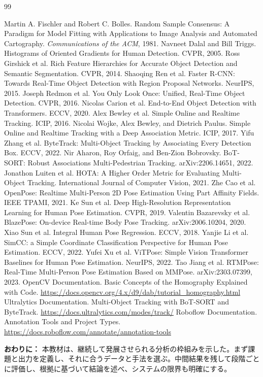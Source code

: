 \documentclass[11pt,a4paper,oneside]{report}
\renewcommand{\bibname}{参考文献}
\begin{document}
\renewcommand{\bibname}{参考文献・関連資料}
\small
\begin{thebibliography}{99}
 Martin A. Fischler and Robert C. Bolles. Random Sample Consensus: A Paradigm for Model Fitting with Applications to Image Analysis and Automated Cartography. \textit{Communications of the ACM}, 1981.
 Navneet Dalal and Bill Triggs. Histograms of Oriented Gradients for Human Detection. CVPR, 2005.
 Ross Girshick et al. Rich Feature Hierarchies for Accurate Object Detection and Semantic Segmentation. CVPR, 2014.
 Shaoqing Ren et al. Faster R-CNN: Towards Real-Time Object Detection with Region Proposal Networks. NeurIPS, 2015.
 Joseph Redmon et al. You Only Look Once: Unified, Real-Time Object Detection. CVPR, 2016.
 Nicolas Carion et al. End-to-End Object Detection with Transformers. ECCV, 2020.
 Alex Bewley et al. Simple Online and Realtime Tracking. ICIP, 2016.
 Nicolai Wojke, Alex Bewley, and Dietrich Paulus. Simple Online and Realtime Tracking with a Deep Association Metric. ICIP, 2017.
 Yifu Zhang et al. ByteTrack: Multi-Object Tracking by Associating Every Detection Box. ECCV, 2022.
 Nir Aharon, Roy Orfaig, and Ben-Zion Bobrovsky. BoT-SORT: Robust Associations Multi-Pedestrian Tracking. arXiv:2206.14651, 2022.
 Jonathon Luiten et al. HOTA: A Higher Order Metric for Evaluating Multi-Object Tracking. International Journal of Computer Vision, 2021.
 Zhe Cao et al. OpenPose: Realtime Multi-Person 2D Pose Estimation Using Part Affinity Fields. IEEE TPAMI, 2021.
 Ke Sun et al. Deep High-Resolution Representation Learning for Human Pose Estimation. CVPR, 2019.
 Valentin Bazarevsky et al. BlazePose: On-device Real-time Body Pose Tracking. arXiv:2006.10204, 2020.
 Xiao Sun et al. Integral Human Pose Regression. ECCV, 2018.
 Yanjie Li et al. SimCC: a Simple Coordinate Classification Perspective for Human Pose Estimation. ECCV, 2022.
 Yufei Xu et al. ViTPose: Simple Vision Transformer Baselines for Human Pose Estimation. NeurIPS, 2022.
 Tao Jiang et al. RTMPose: Real-Time Multi-Person Pose Estimation Based on MMPose. arXiv:2303.07399, 2023.
 OpenCV Documentation. Basic Concepts of the Homography Explained with Code. \url{https://docs.opencv.org/4.x/d9/dab/tutorial_homography.html}
 Ultralytics Documentation. Multi-Object Tracking with BoT-SORT and ByteTrack. \url{https://docs.ultralytics.com/modes/track/}
 Roboflow Documentation. Annotation Tools and Project Types. \url{https://docs.roboflow.com/annotate/annotation-tools}
\end{thebibliography}
\normalsize

\begin{heroBox}
\textbf{おわりに：}\quad
本教材は、継続して発展させられる分析の枠組みを示した。まず課題と出力を定義し、それに合うデータと手法を選ぶ。中間結果を残して段階ごとに評価し、根拠に基づいて結論を述べ、システムの限界も明確にする。
\end{heroBox}
\end{document}

